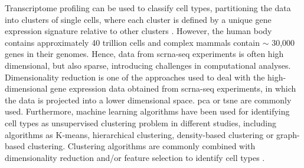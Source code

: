 \documentclass{article}
\begin{document}
\noindent Transcriptome profiling can be used to classify cell types, partitioning the data into clusters of single cells, where each cluster is defined by a unique gene expression signature relative to other clusters \cite{Shekhar2019, Hwang2018}. 
However, the human body contains approximately 40 trillion cells and complex mammals contain $\sim$ 30,000 genes in their genomes. 
Hence, data from \gls{scrna-seq} experiments is often high dimensional, but also sparse, introducing challenges in computational analyses.\\


\noindent Dimensionality reduction is one of the approaches used to deal with the high-dimensional gene expression data obtained from \gls{scrna-seq} experiments, in which the data is projected into a lower dimensional space. 
\gls{pca} or \gls{tsne} are commonly used.
Furthermore, machine learning algorithms have been used for identifying cell types as unsupervised clustering problem in different studies, including algorithms as K-means, hierarchical clustering, density-based clustering or graph-based clustering. 
Clustering algorithms are commonly combined with dimensionality reduction and/or feature selection to identify cell types \cite{andrews2018, Peyvandipour2020}. \\
 
\end{document}
